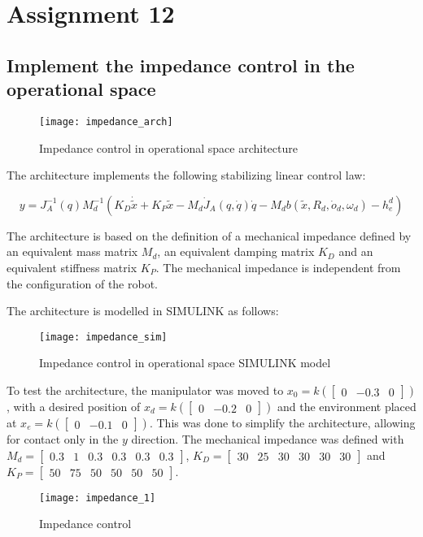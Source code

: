\section{Assignment 12}

\subsection{Implement the impedance control in the operational space}

\begin{figure}[H]
\centering
\texttt{[image: impedance\_arch]}
\caption{Impedance control in operational space architecture}
\end{figure}

The architecture implements the following stabilizing linear control law:

\begin{equation*}
y = J_A^{-1}(q)M_d^{-1}(K_D\dot{\tilde x} + K_P\tilde x - M_d\dot J_A(q,\dot q)\dot q - M_db(\tilde x,R_d,\dot o_d,\omega_d)-h_e^d)
\end{equation*}

The architecture is based on the definition of a mechanical impedance defined by an equivalent mass matrix $M_d$, an equivalent damping matrix $K_D$ and an equivalent stiffness matrix $K_P$. The mechanical impedance is independent from the configuration of the robot.

The architecture is modelled in SIMULINK as follows:

\begin{figure}[H]
\centering
\texttt{[image: impedance\_sim]}
\caption{Impedance control in operational space SIMULINK model}
\end{figure}

To test the architecture, the manipulator was moved to $x_0=k(\begin{bmatrix}
0&-0.3&0
\end{bmatrix})$, with a desired position of $x_d=k(\begin{bmatrix}
0&-0.2&0
\end{bmatrix})$ and the environment placed at $x_e=k(\begin{bmatrix}
0&-0.1&0
\end{bmatrix})$. This was done to simplify the architecture, allowing for contact only in the $y$ direction. The mechanical impedance was defined with $M_d=\begin{bmatrix}
0.3 & 1 & 0.3 & 0.3 & 0.3 & 0.3
\end{bmatrix}$, $K_D=\begin{bmatrix}
30 & 25 & 30 & 30 & 30 & 30
\end{bmatrix}$ and $K_P=\begin{bmatrix}
50 & 75 & 50 & 50 & 50 & 50
\end{bmatrix}$.

\newpage

\begin{figure}[H]
\centering
\texttt{[image: impedance\_1]}
\caption{Impedance control}
\end{figure}